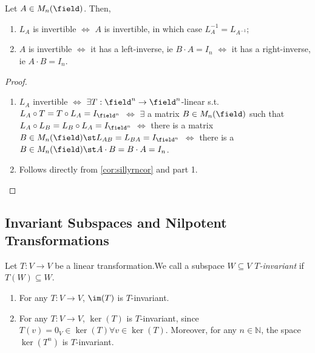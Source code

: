 \begin{proposition}
    Let $A \in M_n(\field)$. Then, \begin{enumerate}
        \item $L_A$ is invertible $\iff$ $A$ is invertible, in which case $L_A^{-1} = L_{A^{-1}}$;
        \item $A$ is invertible $\iff$ it has a left-inverse, ie $B \cdot A = I_n$ $\iff$ it has a right-inverse, ie $A \cdot B = I_n$.
    \end{enumerate}
\end{proposition}

\begin{proof}
    \begin{enumerate}
        \item $L_A$ invertible $\iff$ $\exists T:\field^n \to \field^n$-linear s.t. $L_A \circ T = T \circ L_A = I_{\field^n}$ $\iff$ $\exists$ a matrix $B \in M_n(\field)$ such that $L_A \circ L_B = L_B \circ L_A = I_{\field^n}$ $\iff$ there is a matrix $B \in M_n(\field) \st L_{AB} = L_{BA} = I_{\field^n}$ $\iff$ there is a $B \in M_{n}(\field) \st A \cdot B = B \cdot A = I_n$.
        \item Follows directly from \cref{cor:sillyrncor} and part 1.
    \end{enumerate}
\end{proof}

\subsection{Invariant Subspaces and Nilpotent Transformations}

\begin{definition}[$T$-Invariant]
    Let $T : V \to V$ be a linear transformation.\footnotemark We call a subspace $W \subseteq V$ \emph{$T$-invariant} if $T(W) \subseteq W$.
\end{definition}
\begin{example}
    \begin{enumerate}
        \item For any $T : V \to V$, $\im(T)$ is $T$-invariant.
        \item For any $T:V \to V$, $\ker(T)$ is $T$-invariant, since $T(v) = 0_V \in \ker(T) \forall v \in \ker(T)$. Moreover, for any $n \in \mathbb{N}$, the space $\ker(T^n)$ is $T$-invariant.\footnotemark 
    \end{enumerate}
\end{example}

